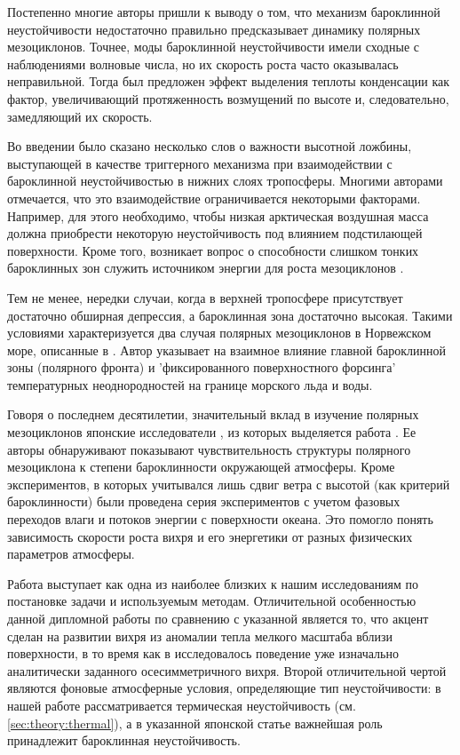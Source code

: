\documentclass[12pt,a4paper]{report}
\begin{document}
Постепенно многие авторы пришли к выводу о том, что механизм бароклинной неустойчивости недостаточно правильно предсказывает динамику полярных мезоциклонов. Точнее, моды бароклинной неустойчивости имели сходные с наблюдениями волновые числа, но их скорость роста часто оказывалась неправильной. Тогда был предложен эффект выделения теплоты конденсации как фактор, увеличивающий протяженность возмущений по высоте и, следовательно, замедляющий их скорость.

Во введении было сказано несколько слов о важности высотной ложбины, выступающей в качестве триггерного механизма при взаимодействии с бароклинной неустойчивостью в нижних слоях тропосферы. Многими авторами отмечается, что это взаимодействие ограничивается некоторыми факторами. Например, для этого необходимо, чтобы низкая арктическая воздушная масса должна приобрести некоторую неустойчивость под влиянием подстилающей поверхности. Кроме того, возникает вопрос о способности слишком тонких бароклинных зон служить источником энергии для роста мезоциклонов \citep{AlbrighEtAl1995}.

Тем не менее, нередки случаи, когда в верхней тропосфере присутствует достаточно обширная депрессия, а бароклинная зона достаточно высокая. Такими условиями характеризуется два случая полярных мезоциклонов в Норвежском море, описанные в \citep{Nordeng1990}. Автор указывает на взаимное влияние главной бароклинной зоны (полярного фронта) и 'фиксированного поверхностного форсинга' температурных неоднородностей на границе морского льда и воды.

Говоря о последнем десятилетии, значительный вклад в изучение полярных мезоциклонов японские исследователи \citep{YanaseEtAl2004,YanaseNiino2004,Nagata1993}, из которых выделяется работа \citep{YanaseNiino2007}. Ее авторы обнаруживают показывают чувствительность структуры полярного мезоциклона к степени бароклинности окружающей атмосферы. Кроме экспериментов, в которых учитывался лишь сдвиг ветра с высотой (как критерий бароклинности) были проведена серия экспериментов с учетом фазовых переходов влаги и потоков энергии с поверхности океана. Это помогло понять зависимость скорости роста вихря и его энергетики от разных физических параметров атмосферы. 

Работа \citep{YanaseNiino2007} выступает как одна из наиболее близких к нашим исследованиям по постановке задачи и используемым методам. Отличительной особенностью данной дипломной работы по сравнению с указанной является то, что акцент сделан на развитии вихря из аномалии тепла мелкого масштаба вблизи поверхности, в то время как в \citep{YanaseNiino2007} исследовалось поведение уже изначально аналитически заданного осесимметричного вихря. Второй отличительной чертой являются фоновые атмосферные условия, определяющие тип неустойчивости: в нашей работе рассматривается термическая неустойчивость (см. \ref{sec:theory:thermal}), а в указанной японской статье важнейшая роль принадлежит бароклинная неустойчивость.
\end{document}
